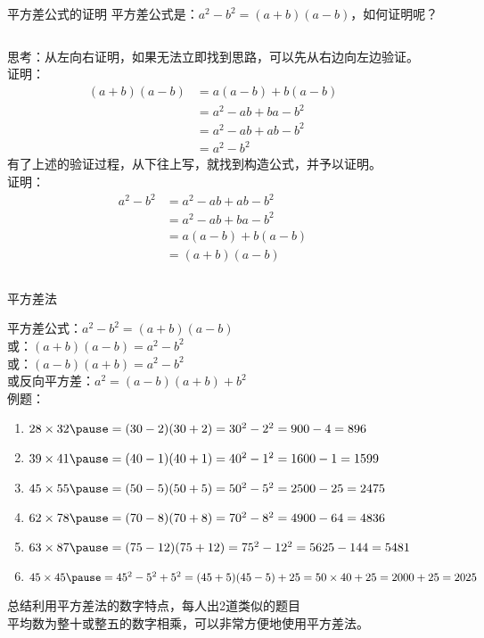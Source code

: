 \documentclass[aspectratio=169]{ctexbeamer} %
\date{\today}
\begin{document}
\begin{frame}[t]{平方差公式的证明}
平方差公式是：$a^2 - b^2 = (a + b)(a - b)$，如何证明呢？
\vspace{1cm}
\begin{columns}[t]
思考：从左向右证明，如果无法立即找到思路，可以先从右边向左边验证。\\
证明：
\begin{align*}
  (a + b)(a - b) &= a(a - b) + b(a - b)  \\
  &= a^2 - ab + ba - b^2 \\
  &= a^2 - ab + ab - b^2 \\
  &= a^2 - b^2
\end{align*}
 有了上述的验证过程，从下往上写，就找到构造公式，并予以证明。\\
 证明：
\begin{align*}
  a^2 - b^2  &= a^2 - ab + ab - b^2 \\
  &= a^2 - ab + ba - b^2 \\
  &= a(a - b) + b(a - b) \\
  &= (a + b)(a - b) 
 \end{align*}
\end{columns}
\end{frame}


\begin{frame}[t]{平方差法}
\begin{spacing}{1.2}
\normalsize
平方差公式：$a^2 - b^2 = (a+b)(a-b)$ \\
或：$(a+b)(a-b)=a^2 - b^2$ \\
或：$(a-b)(a+b)=a^2 - b^2$ \\
或反向平方差：$a^2 = (a-b)(a+b) + b^2$ \\
例题：
\begin{enumerate}[label={\arabic*.}]
\item $28 \times 32 \pause = (30-2)(30+2)=30^2-2^2=900-4=896$
\item $39 \times 41 \pause = (40-1)(40+1)=40^2-1^2=1600-1=1599$
\item $45 \times 55 \pause = (50-5)(50+5)=50^2-5^2=2500-25=2475$
\item $62 \times 78 \pause = (70-8)(70+8)=70^2-8^2=4900-64=4836$
\item $63 \times 87 \pause = (75-12)(75+12)=75^2-12^2=5625-144=5481$
\item $45 \times 45 \pause = 45^2 - 5^2 + 5^2 = (45+5)(45-5) + 25 =50 \times 40 + 25=2000 + 25 = 2025$
\end{enumerate}
\alert{总结利用平方差法的数字特点，每人出2道类似的题目} \\
\pause
平均数为整十或整五的数字相乘，可以非常方便地使用平方差法。
\end{spacing}
\end{frame}
\end{document}
